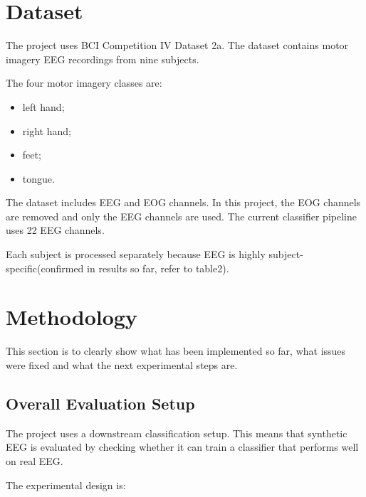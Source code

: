 \documentclass[conference]{IEEEtran}
\begin{document}
\vspace{2em}

\section{Dataset}

The project uses BCI Competition IV Dataset 2a. The dataset contains motor imagery EEG recordings from nine subjects.

The four motor imagery classes are:

\begin{itemize}
\item left hand;
\item right hand;
\item feet;
\item tongue.
\end{itemize}

The dataset includes EEG and EOG channels. In this project, the EOG channels are removed and only the EEG channels are used. The current classifier pipeline uses 22 EEG channels.

Each subject is processed separately because EEG is highly subject-specific(confirmed in results so far, refer to table2).

\vspace{2em}

\section{Methodology}

This section is to clearly show what has been implemented so far, what issues were fixed and what the next experimental steps are.

\vspace{0.5em}

\subsection{Overall Evaluation Setup}

The project uses a downstream classification setup. This means that synthetic EEG is evaluated by checking whether it can train a classifier that performs well on real EEG.

The experimental design is:
\end{document}
